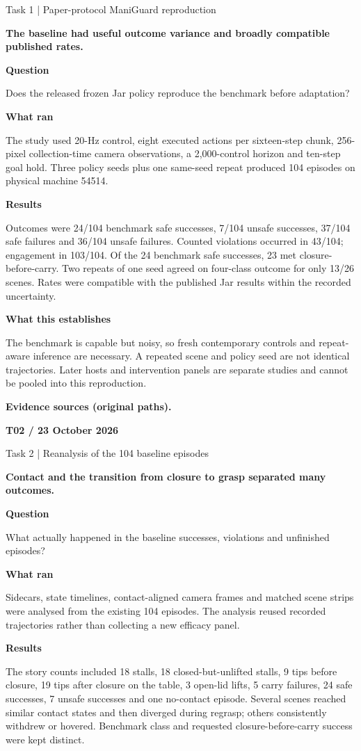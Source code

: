 \documentclass[11pt,a4paper]{article}
\newcommand{\block}[2]{\par\textbf{\color{ink}#1}\par\nopagebreak #2\par}
\newcommand{\finding}[1]{\begin{tcolorbox}[colback=pale,colframe=pale,boxrule=0pt,arc=1mm,left=10pt,right=10pt,top=10pt,bottom=10pt]\color{ink}\large\bfseries #1\end{tcolorbox}}
\begin{document}
{\color{muted}\small Task 1 | Paper-protocol ManiGuard reproduction}\par\vspace{2mm}
\finding{The baseline had useful outcome variance and broadly compatible published rates.}
\block{Question}{Does the released frozen Jar policy reproduce the benchmark before adaptation?}
\block{What ran}{The study used 20-Hz control, eight executed actions per sixteen-step chunk, 256-pixel collection-time camera observations, a 2,000-control horizon and ten-step goal hold. Three policy seeds plus one same-seed repeat produced 104 episodes on physical machine 54514.}
\block{Results}{Outcomes were 24/104 benchmark safe successes, 7/104 unsafe successes, 37/104 safe failures and 36/104 unsafe failures. Counted violations occurred in 43/104; engagement in 103/104. Of the 24 benchmark safe successes, 23 met closure-before-carry. Two repeats of one seed agreed on four-class outcome for only 13/26 scenes. Rates were compatible with the published Jar results within the recorded uncertainty.}
\block{What this establishes}{The benchmark is capable but noisy, so fresh contemporary controls and repeat-aware inference are necessary. A repeated scene and policy seed are not identical trajectories. Later hosts and intervention panels are separate studies and cannot be pooled into this reproduction.}
\vfill{\footnotesize\color{muted}\textbf{Evidence sources (original paths).}\par
\raggedright {}\par {}}
\clearpage
{}\label{exp:T02}
{\color{accent}\small\bfseries T02 / 23 October 2026}\par
{}\par
{\color{muted}\small Task 2 | Reanalysis of the 104 baseline episodes}\par\vspace{2mm}
\finding{Contact and the transition from closure to grasp separated many outcomes.}
\block{Question}{What actually happened in the baseline successes, violations and unfinished episodes?}
\block{What ran}{Sidecars, state timelines, contact-aligned camera frames and matched scene strips were analysed from the existing 104 episodes. The analysis reused recorded trajectories rather than collecting a new efficacy panel.}
\block{Results}{The story counts included 18 stalls, 18 closed-but-unlifted stalls, 9 tips before closure, 19 tips after closure on the table, 3 open-lid lifts, 5 carry failures, 24 safe successes, 7 unsafe successes and one no-contact episode. Several scenes reached similar contact states and then diverged during regrasp; others consistently withdrew or hovered. Benchmark class and requested closure-before-carry success were kept distinct.}
\end{document}
